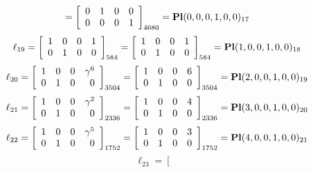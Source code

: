 \documentclass{article}
\begin{document}
{$$=
\left[
\begin{array}{*{4}c}
0  & 1  & 0  & 0\\
0  & 0  & 0  & 1\\
\end{array}
\right]_{4680}
={\rm\bf Pl}(0,0,0,1,0,0 )_{17}$$
$$
\ell_{19} = 
\left[
\begin{array}{*{4}{r}}
1 & 0 & 0 & 1\\
0 & 1 & 0 & 0\\
\end{array}
\right]
_{584}
=
\left[
\begin{array}{*{4}c}
1  & 0  & 0  & 1\\
0  & 1  & 0  & 0\\
\end{array}
\right]_{584}
={\rm\bf Pl}(1,0,0,1,0,0 )_{18}$$
$$
\ell_{20} = 
\left[
\begin{array}{*{4}{r}}
1 & 0 & 0 & \gamma^{6}\\
0 & 1 & 0 & 0\\
\end{array}
\right]
_{3504}
=
\left[
\begin{array}{*{4}c}
1  & 0  & 0  & 6\\
0  & 1  & 0  & 0\\
\end{array}
\right]_{3504}
={\rm\bf Pl}(2,0,0,1,0,0 )_{19}$$
$$
\ell_{21} = 
\left[
\begin{array}{*{4}{r}}
1 & 0 & 0 & \gamma^{2}\\
0 & 1 & 0 & 0\\
\end{array}
\right]
_{2336}
=
\left[
\begin{array}{*{4}c}
1  & 0  & 0  & 4\\
0  & 1  & 0  & 0\\
\end{array}
\right]_{2336}
={\rm\bf Pl}(3,0,0,1,0,0 )_{20}$$
$$
\ell_{22} = 
\left[
\begin{array}{*{4}{r}}
1 & 0 & 0 & \gamma^{5}\\
0 & 1 & 0 & 0\\
\end{array}
\right]
_{1752}
=
\left[
\begin{array}{*{4}c}
1  & 0  & 0  & 3\\
0  & 1  & 0  & 0\\
\end{array}
\right]_{1752}
={\rm\bf Pl}(4,0,0,1,0,0 )_{21}$$
$$
\ell_{23} = 
\left[
\begin{array}{*{4}{r}}

\end{array}$$}
\end{document}

